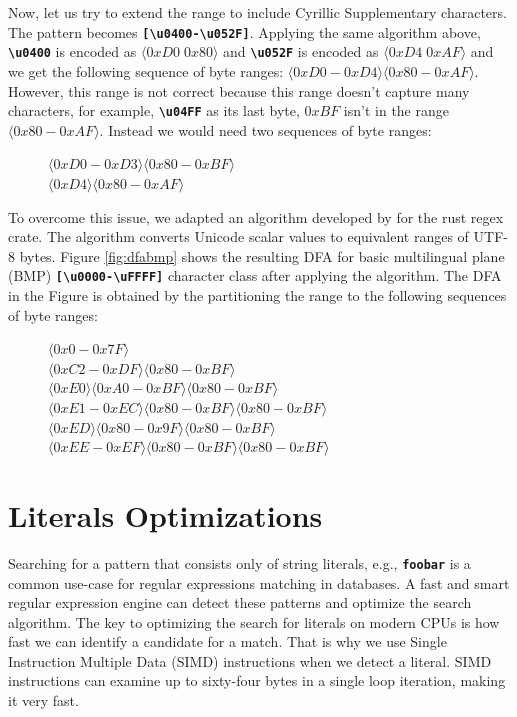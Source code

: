 Now, let us try to extend the range to include Cyrillic Supplementary characters. The pattern becomes \texttt{\textbf{[\textbackslash u0400-\textbackslash u052F]}}. Applying the same algorithm above,  \texttt{\textbf{\textbackslash u0400}} is encoded as $\langle0xD0 \; 0x80\rangle$ and \texttt{\textbf{\textbackslash u052F}} is encoded as $\langle0xD4 \; 0xAF\rangle$ and we get the following sequence of byte ranges: $\langle0xD0-0xD4\rangle \langle0x80-0xAF\rangle$. However, this range is not correct because this range doesn't capture many characters, for example, \texttt{\textbf{\textbackslash u04FF}} as its last byte, $0xBF$ isn't in the range $\langle0x80-0xAF\rangle$. Instead we would need two sequences of byte ranges:

\begin{figure}[H]
\centering
$\langle0xD0-0xD3\rangle \langle0x80-0xBF\rangle$\\
$\langle0xD4\rangle \langle0x80-0xAF\rangle$
\end{figure}


To overcome this issue, we adapted an algorithm developed by \citet{utf8-ranges} for the rust regex crate. The algorithm converts Unicode scalar values to equivalent ranges of UTF-8 bytes. Figure \ref{fig:dfabmp} shows the resulting DFA for basic multilingual plane (BMP) \texttt{\textbf{[\textbackslash u{0000}-\textbackslash u{FFFF}]}} character class after applying the algorithm. The DFA in the Figure is obtained by the partitioning the range to the following sequences of byte ranges:

\begin{figure}[H]
\centering
$\langle0x0-0x7F\rangle$\\
$\langle0xC2-0xDF\rangle \langle0x80-0xBF\rangle$\\
$\langle0xE0\rangle \langle0xA0-0xBF\rangle \langle0x80-0xBF\rangle$\\
$\langle0xE1-0xEC\rangle \langle0x80-0xBF\rangle \langle0x80-0xBF\rangle$\\
$\langle0xED\rangle \langle0x80-0x9F\rangle \langle0x80-0xBF\rangle$\\
$\langle0xEE-0xEF\rangle \langle0x80-0xBF\rangle \langle0x80-0xBF\rangle$
\end{figure}


\section{Literals Optimizations}\label{section:simdopt}
Searching for a pattern that consists only of string literals, e.g., \texttt{\textbf{foobar}} is a common use-case for regular expressions matching in databases. A fast and smart regular expression engine can detect these patterns and optimize the search algorithm. The key to optimizing the search for literals on modern CPUs is how fast we can identify a candidate for a match. That is why we use Single Instruction Multiple Data (SIMD) instructions when we detect a literal. SIMD instructions can examine up to sixty-four bytes in a single loop iteration, making it very fast.

